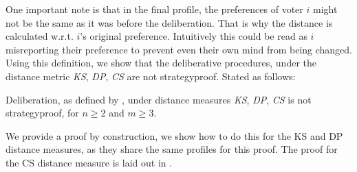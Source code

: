 One important note is that in the final profile, the
preferences of voter \(i\) might not be the same as it was
before the deliberation. That is why the distance is calculated
w.r.t. \(i\)'s original preference. Intuitively this could be
read as \(i\) misreporting their preference to prevent even
their own mind from being changed. Using this definition, we
show that the deliberative procedures, under the distance metric
\emph{KS}, \emph{ DP}, \emph{ CS} are not strategyproof. Stated
as follows:

\begin{proposition}
	\label{prop:rad_roy_delib}
	Deliberation, as defined by
	\citet{radDeliberationSinglePeakednessCoherent2021}, under distance
	measures \emph{KS}, \emph{ DP}, \emph{ CS} is not strategyproof, for $n
		\geq 2$ and $m \geq 3$.
\end{proposition}

We provide a proof by construction, we show how to do this for
the KS and DP distance measures, as they share the same profiles for this proof. The
proof for the CS distance measure is laid out in .

